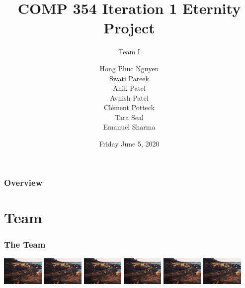 \documentclass{beamer}
\title{COMP 354 Iteration 1 Eternity Project}
\subtitle {Team I}
\author
{
Hong Phuc Nguyen \\ Swati Pareek \\Anik Patel\\Avnish Patel 
\\Clément Potteck \\ Tara Seal \\Emanuel Sharma
}
\institute{
Concordia University
}
\date{Friday June 5, 2020}
\begin{document}
\frame{\titlepage}

\begin{frame}
\frametitle{Overview}
\tableofcontents
\end{frame}

\section{Team}



\begin{frame}
\frametitle{The Team}
\null\hfil\hfil{}
\hfil\hfil{}
\hfil\hfil{}
\hfil\hfil{}
\newline
\hfil\includegraphics[width=2cm]{Screen Shot}
\hfil\hfil\hfil\includegraphics[width=2cm]{Screen Shot}
\hfil\hfil\hfil\includegraphics[width=2cm]{Screen Shot}
\hfil\hfil\hfil\hfil\includegraphics[width=2cm]{Screen Shot}\newline
\null\hfil\hfil{}
\hfil\hfil{}
\hfil\hfil{}
\hfil\hfil{}
\newline\newline
\vfil
\null\hfil\hfil{}
\hfil\hfil{}
\hfil\hfil{}\newline
\hfil\hfil\includegraphics[width=2cm]{Screen Shot}
\hfil\hfil\includegraphics[width=2cm]{Screen Shot}

\end{frame}
\end{document}
